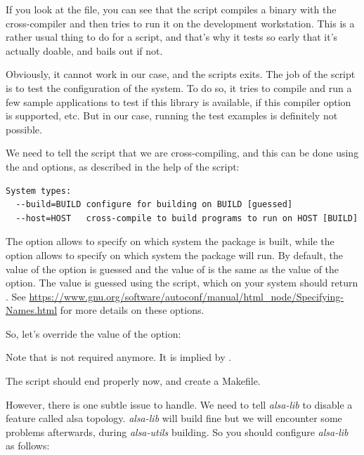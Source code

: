 If you look at the  file, you can see that the
 script compiles a binary with the cross-compiler
and then tries to run it on the development workstation. This is a
rather usual thing to do for a  script, and that's
why it tests so early that it's actually doable, and bails out if not.

Obviously, it cannot work in our case, and the scripts exits. The job
of the  script is to test the configuration of the system. To
do so, it tries to compile and run a few sample applications to test
if this library is available, if this compiler option is supported,
etc. But in our case, running the test examples is definitely not
possible.

We need to tell the  script that we are cross-compiling, and
this can be done using the  and  options,
as described in the help of the  script:

\begin{verbatim}
System types:
  --build=BUILD	configure for building on BUILD [guessed]
  --host=HOST	cross-compile to build programs to run on HOST [BUILD]
\end{verbatim}

The  option allows to specify on which system the
package is built, while the  option allows to specify on
which system the package will run. By default, the value of the
 option is guessed and the value of  is the
same as the value of the  option. The value is guessed
using the  script, which on your system should
return . See
\url{https://www.gnu.org/software/autoconf/manual/html_node/Specifying-Names.html}
for more details on these options.

So, let's override the value of the  option:


Note that  is not required anymore. It is implied
by .

The  script should end properly now, and create a
Makefile.

However, there is one subtle issue to handle.
We need to tell {\em alsa-lib} to disable a feature called alsa topology.
{\em alsa-lib} will build fine but we will encounter some
problems afterwards, during {\em alsa-utils} building.
So you should configure {\em alsa-lib} as follows:

